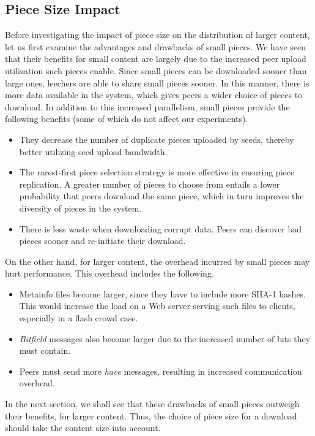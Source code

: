 \documentclass[twocolumn,letterpaper,11pt]{article}
\begin{document}
\subsection{Piece Size Impact}

Before investigating the impact of piece size on the distribution of larger content,
let us first examine the advantages and drawbacks of small pieces.
We have seen that their benefits for small content are largely due 
to the increased peer upload utilization such pieces enable.
Since small pieces can be downloaded sooner than large ones,
leechers are able to share small pieces sooner. In this manner, 
there is more data available in the system, which gives peers a wider
choice of pieces to download. In addition to this increased parallelism, small pieces
provide the following benefits (some of which do not affect our experiments).

\begin{itemize}
\item They decrease the number of duplicate 
pieces uploaded by seeds, thereby better utilizing seed upload
bandwidth.
\item The rarest-first piece selection strategy is more effective in ensuring piece replication.
A greater number of pieces to choose from entails a lower probability that peers
download the same piece, which in turn improves the diversity of pieces
in the system.
\item There is less waste when downloading corrupt data.
Peers can discover bad pieces sooner and re-initiate their download.
\end{itemize}

On the other hand, for larger content, the overhead incurred by small pieces may
hurt performance. This overhead includes the following.

\begin{itemize}
\item Metainfo files become larger, since they have to include more SHA-1 hashes.
This would increase the load on a Web
server serving such files to clients, especially in a flash crowd case.
\item \textit{Bitfield} messages also become larger due to the increased number of bits 
they must contain.
\item Peers must send more \textit{have} messages, resulting in increased
communication overhead.
\end{itemize}

In the next section, we shall see that these drawbacks of small pieces outweigh their benefits, 
for larger content.
Thus, the choice of piece size for a download should take
the content size into account.
\end{document}
